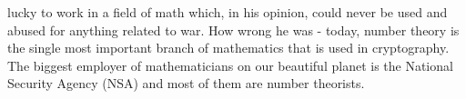 lucky to work in a field of math which, in his opinion, could never be used and abused for anything related to war. How wrong he was - today, number theory is the single most important branch of mathematics that is used in cryptography. The biggest employer of mathematicians on our beautiful planet is the National Security Agency (NSA) and most of them are number theorists.








